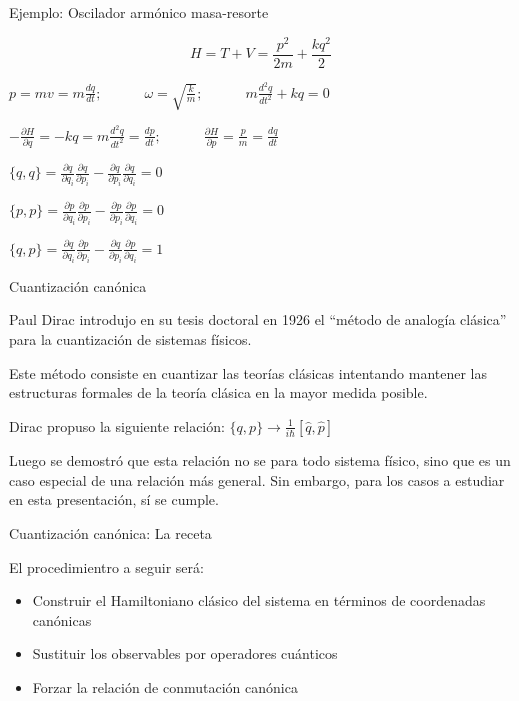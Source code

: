 \documentclass[spanish]{beamer}
\begin{document}
\begin{frame}{Ejemplo: Oscilador armónico masa-resorte}
\protect\hypertarget{ejemplo-oscilador-armuxf3nico-masa-resorte}{}

\[H=T+V=\frac{p^2}{2m}+\frac{k q^2}{2}\]

\(p=mv=m \frac{dq}{dt}; \qquad \quad \omega=\sqrt{\frac{k}{m}}; \qquad \quad  m \frac{d^2q}{dt^2} + k q=0\)

\(-\frac{\partial H}{\partial q} = -k q = m \frac{d^2q}{dt^2} = \frac{dp}{dt};  \qquad \quad \frac{\partial H}{\partial p} = \frac{p}{m} = \frac{dq}{dt}\)

\(\{q,q\} = \frac{\partial q}{\partial q_i}  \frac{\partial q}{\partial p_i} - \frac{\partial q}{\partial p_i}  \frac{\partial q}{\partial q_i} = 0\)

\(\{p,p\} = \frac{\partial p}{\partial q_i}  \frac{\partial p}{\partial p_i} - \frac{\partial p}{\partial p_i}  \frac{\partial p}{\partial q_i} = 0\)

\(\{q,p\} = \frac{\partial q}{\partial q_i}  \frac{\partial p}{\partial p_i} - \frac{\partial q}{\partial p_i}  \frac{\partial p}{\partial q_i} = 1\)

\end{frame}

\begin{frame}{Cuantización canónica}
\protect\hypertarget{cuantizaciuxf3n-canuxf3nica}{}

Paul Dirac introdujo en su tesis doctoral en 1926 el “método de analogía
clásica” para la cuantización de sistemas físicos.

Este método consiste en cuantizar las teorías clásicas intentando
mantener las estructuras formales de la teoría clásica en la mayor
medida posible.

Dirac propuso la siguiente relación:
\(\{q,p\} \rightarrow \frac{1}{i\hbar} [\hat{q},\hat{p}]\)

Luego se demostró que esta relación no se para todo sistema físico, sino
que es un caso especial de una relación más general. Sin embargo, para
los casos a estudiar en esta presentación, sí se cumple.

\end{frame}

\begin{frame}{Cuantización canónica: La receta}
\protect\hypertarget{cuantizaciuxf3n-canuxf3nica-la-receta}{}

El procedimientro a seguir será:

\begin{itemize}
\item
  Construir el Hamiltoniano clásico del sistema en términos de
  coordenadas canónicas
\item
  Sustituir los observables por operadores cuánticos
\item
  Forzar la relación de conmutación canónica
\end{itemize}

\end{frame}
\end{document}
